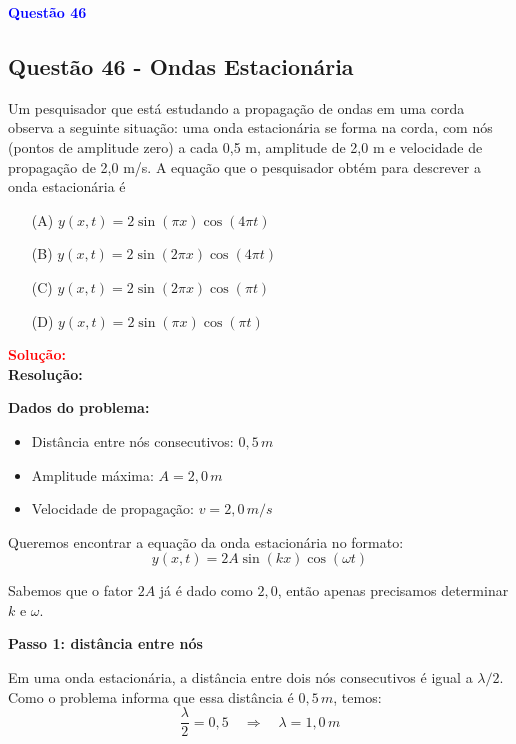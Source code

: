 \begin{flushleft}
\textbf{\textcolor{blue}{\Large Quest\~ao 46}}\\
\noindent
\subsection{Quest\~ao 46 - Ondas Estacionária}
Um pesquisador que está estudando a propagação de ondas em uma corda observa a seguinte situação: uma
onda estacionária se forma na corda, com nós (pontos de amplitude zero) a cada 0,5 m, amplitude de 2,0 m e
velocidade de propagação de 2,0 m/s. A equação que o pesquisador obtém para descrever a onda estacionária é

\begin{itemize}
\item[(A)] $y(x,t) = 2\sin(\pi x)\cos(4\pi t)$
\item[(B)] $y(x,t) = 2\sin(2\pi x)\cos(4\pi t)$
\item[(C)] $y(x,t) = 2\sin(2\pi x)\cos(\pi t)$
\item[(D)] $y(x,t) = 2\sin(\pi x)\cos(\pi t)$
\end{itemize}

\vspace{0.5cm}

\textcolor{red}{\textbf{Solução:}}\\

\textbf{Resolução:}

\bigskip

\textbf{Dados do problema:}
\begin{itemize}
    \item Distância entre nós consecutivos: \(0{,}5\,m\)
    \item Amplitude máxima: \(A = 2,0\,m\)
    \item Velocidade de propagação: \(v = 2,0\,m/s\)
\end{itemize}

Queremos encontrar a equação da onda estacionária no formato:
\[
y(x,t) = 2A \sin(kx) \cos(\omega t)
\]

Sabemos que o fator \(2A\) já é dado como \(2,0\), então apenas precisamos determinar \(k\) e \(\omega\).

\bigskip

\textbf{Passo 1: distância entre nós}

Em uma onda estacionária, a distância entre dois nós consecutivos é igual a \(\lambda/2\).  
Como o problema informa que essa distância é \(0{,}5\,m\), temos:
\[
\frac{\lambda}{2} = 0{,}5 \quad \Longrightarrow \quad \lambda = 1,0\,m
\]


\end{flushleft}
